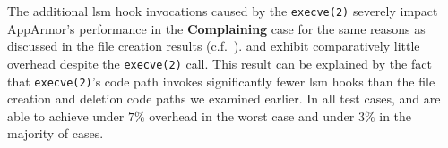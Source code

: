 The additional \gls{lsm} hook invocations caused by the \texttt{execve(2)} severely impact
AppArmor's performance in the \textbf{Complaining} case for the same reasons as discussed
in the file creation results (c.f.\ ). \bpfbox{} and \bpfcontain{}
exhibit comparatively little overhead despite the \texttt{execve(2)} call. This result
can be explained by the fact that \texttt{execve(2)}'s code path invokes significantly
fewer \gls{lsm} hooks than the file creation and deletion code paths we examined earlier.
In all test cases, \bpfbox{} and \bpfcontain{} are able to achieve under $7\%$ overhead in
the worst case and under $3\%$ in the majority of cases.




